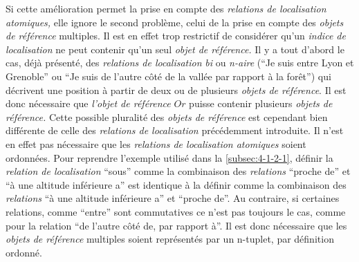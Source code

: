 Si cette amélioration permet la prise en compte des \emph{relations de
  localisation atomiques,} elle ignore le second problème, celui de la
prise en compte des \emph{objets de référence} multiples. Il est en
effet trop restrictif de considérer qu'un \emph{indice de
  localisation} ne peut contenir qu'un seul \emph{objet de référence.}
Il y a tout d'abord le cas, déjà présenté, des \emph{relations de
  localisation} \emph{bi} ou \emph{n-aire} (\eg \enquote{Je suis entre
  Lyon et Grenoble} ou \enquote{Je suis de l'autre côté de la vallée
  par rapport à la forêt}) qui décrivent une position à partir de deux
ou de plusieurs \emph{objets de référence}. Il est donc nécessaire que
\emph{l'objet de référence} \(Or\) puisse contenir plusieurs
\emph{objets de référence.} Cette possible pluralité des \emph{objets
  de référence} est cependant bien différente de celle des
\emph{relations de localisation} précédemment introduite. Il n'est en
effet pas nécessaire que les \emph{relations de localisation
  atomiques} soient ordonnées. Pour reprendre l'exemple utilisé dans
la \autoref{subsec:4-1-2-1}, définir la \emph{relation de
  localisation} \enquote{sous} comme la combinaison des
\emph{relations} \enquote{proche de} et \enquote{à une altitude
  inférieure a} est identique à la définir comme la combinaison des
\emph{relations} \enquote{à une altitude inférieure a} et
\enquote{proche de}. Au contraire, si certaines relations, comme
\enquote{entre} sont commutatives ce n'est pas toujours le cas, comme
pour la relation \enquote{de l'autre côté de, par rapport à}. Il est
donc nécessaire que les \emph{objets de référence} multiples soient
représentés par un n-tuplet, par définition ordonné.

